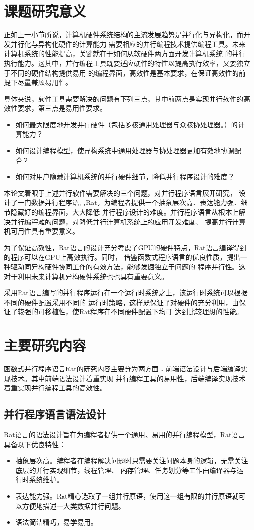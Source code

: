 \section{课题研究意义}
正如上一小节所说，计算机硬件系统结构的主流发展趋势是并行化与异构化，而开发并行化与异构化硬件的计算能力
需要相应的并行编程技术提供编程工具。未来计算机系统的性能提高，关键就在于如何从软硬件两方面开发计算机系统
的并行执行能力。这其中，并行编程工具既要适应硬件的特性以提高执行效率，又要独立于不同的硬件结构提供易用
的编程界面，高效性是基本要求，在保证高效性的前提下尽量兼顾易用性。

具体来说，软件工具需要解决的问题有下列三点，其中前两点是实现并行软件的高效性要求，第三点是易用性要求。
\begin{itemize}
  \item 如何最大限度地开发并行硬件（包括多核通用处理器与众核协处理器。）的计算能力？
  \item 如何设计编程模型，使异构系统中通用处理器与协处理器更加有效地协调配合？
  \item 如何对用户隐藏计算机系统的并行硬件细节，降低并行程序设计的难度？
\end{itemize}

本论文着眼于上述并行软件需要解决的三个问题，对并行程序语言展开研究，
设计了一门数据并行程序语言Rat，为编程者提供一个抽象层次高、表达能力强、细节隐藏好的编程界面，大大降低
并行程序设计的难度。并行程序语言从根本上解决并行编程难的问题，对降低并行计算机系统上的应用开发难度、
提高并行计算机可用性具有重要意义。

为了保证高效性，Rat语言的设计充分考虑了GPU的硬件特点，Rat语言编译得到的程序可以在GPU上高效执行。同时，
借鉴函数式程序语言的优良性质，提出一种驱动同异构硬件协同工作的有效方法，能够发掘独立于问题的
程序并行性。这对于利用未来计算机异构硬件系统也也具有重要意义。

采用Rat语言编写的并行程序运行在一个运行时系统之上，该运行时系统可以根据不同的硬件配置采用不同的
运行时策略，这样既保证了对硬件的充分利用，由保证了较强的可移植性，使Rat程序在不同硬件配置下均可
达到比较理想的性能。

\section{主要研究内容}
函数式并行程序语言Rat的研究内容主要分为两方面：前端语法设计与后端编译实现技术。其中前端语法设计着重实现
并行编程工具的易用性，后端编译实现技术着重实现并行编程工具的高效性。

\subsection{并行程序语言语法设计}
Rat语言的语法设计旨在为编程者提供一个通用、易用的并行编程模型，Rat语言具备以下优良特性：
\begin{itemize}
  \item 抽象层次高。编程者在编程解决问题时只需要关注问题本身的逻辑，无需关注底层的并行实现细节，线程管理、
    内存管理、任务划分等工作由编译器与运行时系统维护。
  \item 表达能力强。Rat精心选取了一组并行原语，使用这一组有限的并行原语就可以方便地描述一大类数据并行问题。
  \item 语法简洁精巧，易学易用。
\end{itemize}

